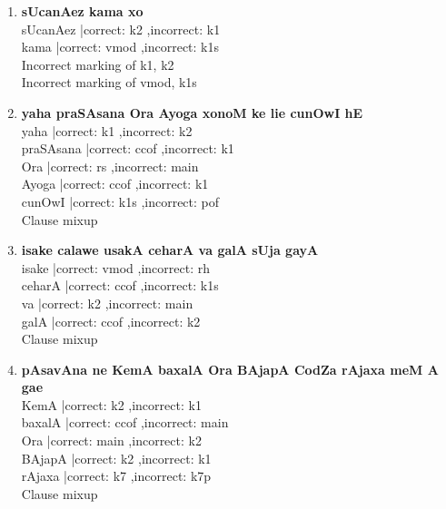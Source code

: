 \documentclass[a4 paper]{article}
\begin{document}
\begin{enumerate}
    \item \textbf{sUcanAez kama xo}\\
        sUcanAez |correct: k2 ,incorrect: k1        \\
        kama |correct: vmod ,incorrect: k1s         \\
        \addlinespace[1em]
        Incorrect marking of k1, k2\\
        Incorrect marking of vmod, k1s\\

    \item \textbf{yaha praSAsana Ora Ayoga xonoM ke lie cunOwI hE}\\
        yaha |correct: k1 ,incorrect: k2        \\
        praSAsana |correct: ccof ,incorrect: k1         \\
        Ora |correct: rs ,incorrect: main       \\
        Ayoga |correct: ccof ,incorrect: k1         \\
        cunOwI |correct: k1s ,incorrect: pof        \\
        \addlinespace[1em]
        Clause mixup\\

    \item \textbf{isake calawe usakA ceharA va galA sUja gayA}\\
        isake |correct: vmod ,incorrect: rh         \\
        ceharA |correct: ccof ,incorrect: k1s       \\
        va |correct: k2 ,incorrect: main        \\
        galA |correct: ccof ,incorrect: k2      \\
        \addlinespace[1em]
        Clause mixup\\

    \item \textbf{pAsavAna ne KemA baxalA Ora BAjapA CodZa rAjaxa meM A gae}\\
        KemA |correct: k2 ,incorrect: k1        \\
        baxalA |correct: ccof ,incorrect: main      \\
        Ora |correct: main ,incorrect: k2       \\
        BAjapA |correct: k2 ,incorrect: k1      \\
        rAjaxa |correct: k7 ,incorrect: k7p         \\
        \addlinespace[1em]
        Clause mixup\\
\end{enumerate}
\end{document}
